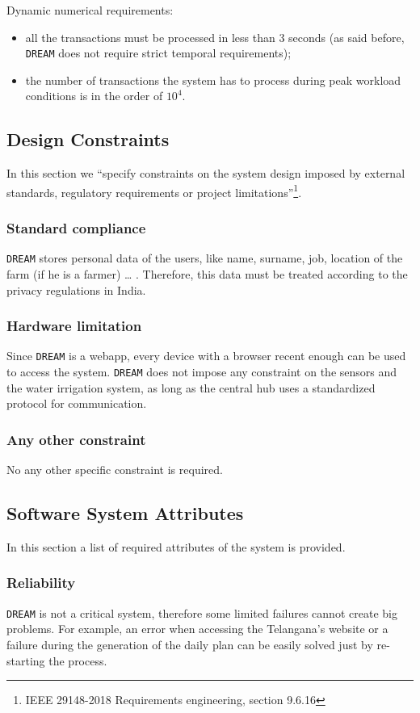 \documentclass{article}
\begin{document}
Dynamic numerical requirements:
\begin{itemize}
\item all the transactions must be processed in less than 3 seconds (as said before, \verb|DREAM| does not require strict temporal requirements);
\item the number of transactions the system has to process during peak workload conditions is in the order of $10^4$.
\end{itemize}

\subsection{Design Constraints}
In this section we “specify constraints on the system design imposed by external standards, regulatory requirements or project limitations”\footnote{IEEE 29148-2018 Requirements engineering, section 9.6.16}.
\subsubsection{Standard compliance}
\verb|DREAM| stores personal data of the users, like name, surname, job, location of the farm (if he is a farmer) … . Therefore, this data must be treated according to the privacy regulations in India.
\subsubsection{Hardware limitation}
Since \verb|DREAM| is a webapp, every device with a browser recent enough can be used to access the system. \verb|DREAM| does not impose any constraint on the sensors and the water irrigation system, as long as the central hub uses a standardized protocol for communication.
\subsubsection{Any other constraint}
No any other specific constraint is required.
\subsection{Software System Attributes}
In this section a list of required attributes of the system is provided.
\subsubsection{Reliability}
\verb|DREAM| is not a critical system, therefore some limited failures cannot create big problems. For example, an error when accessing the Telangana’s website or a failure during the generation of the daily plan can be easily solved just by re-starting the process.
\end{document}
